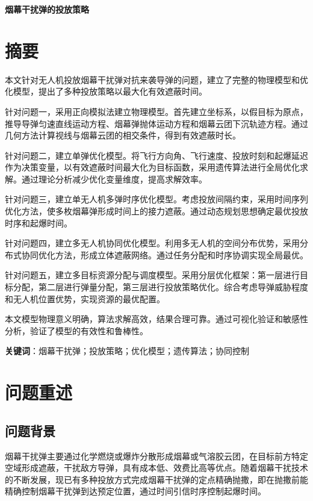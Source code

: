 \documentclass[12pt,a4paper]{article}
\begin{document}
\begin{center}
{\LARGE\bfseries 烟幕干扰弹的投放策略}
\end{center}

\section*{摘要}

本文针对无人机投放烟幕干扰弹对抗来袭导弹的问题，建立了完整的物理模型和优化模型，提出了多种投放策略以最大化有效遮蔽时间。

针对问题一，采用正向模拟法建立物理模型。首先建立坐标系，以假目标为原点，推导导弹匀速直线运动方程、烟幕弹抛体运动方程和烟幕云团下沉轨迹方程。通过几何方法计算视线与烟幕云团的相交条件，得到有效遮蔽时长。

针对问题二，建立单弹优化模型。将飞行方向角、飞行速度、投放时刻和起爆延迟作为决策变量，以有效遮蔽时间最大化为目标函数，采用遗传算法进行全局优化求解。通过理论分析减少优化变量维度，提高求解效率。

针对问题三，建立单无人机多弹时序优化模型。考虑投放间隔约束，采用时间序列优化方法，使多枚烟幕弹形成时间上的接力遮蔽。通过动态规划思想确定最优投放时序和起爆时间。

针对问题四，建立多无人机协同优化模型。利用多无人机的空间分布优势，采用分布式协同优化方法，形成立体遮蔽网络。通过任务分配和时序协调实现全局最优。

针对问题五，建立多目标资源分配与调度模型。采用分层优化框架：第一层进行目标分配，第二层进行弹量分配，第三层进行投放策略优化。综合考虑导弹威胁程度和无人机位置优势，实现资源的最优配置。

本文模型物理意义明确，算法求解高效，结果合理可靠。通过可视化验证和敏感性分析，验证了模型的有效性和鲁棒性。

\textbf{关键词}：烟幕干扰弹；投放策略；优化模型；遗传算法；协同控制

\tableofcontents
\newpage
\listoffigures
\listoftables
\newpage

\section{问题重述}

\subsection{问题背景}

烟幕干扰弹主要通过化学燃烧或爆炸分散形成烟幕或气溶胶云团，在目标前方特定空域形成遮蔽，干扰敌方导弹，具有成本低、效费比高等优点。随着烟幕干扰技术的不断发展，现已有多种投放方式完成烟幕干扰弹的定点精确抛撒，即在抛撒前能精确控制烟幕干扰弹到达预定位置，通过时间引信时序控制起爆时间。
\end{document}
